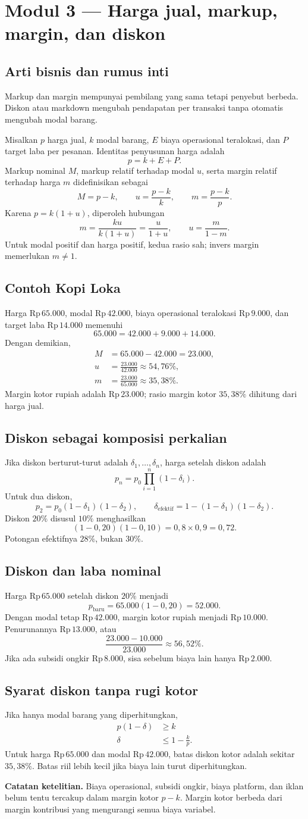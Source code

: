 \documentclass[11pt,a4paper]{article}
\newcommand{\modul}[2]{\clearpage\section{Modul #1 --- #2}}
\newcommand{\bagian}[1]{\Needspace{5\baselineskip}\subsection{#1}}
\newcommand{\catatan}[1]{\par\textbf{Catatan ketelitian.} #1\par}
\newcommand{\rp}[1]{\ensuremath{\mathrm{Rp}\,#1}}
\begin{document}
\modul{3}{Harga jual, markup, margin, dan diskon}
\bagian{Arti bisnis dan rumus inti}
Markup dan margin mempunyai pembilang yang sama tetapi penyebut berbeda. Diskon atau markdown mengubah pendapatan per transaksi tanpa otomatis mengubah modal barang.

Misalkan \(p\) harga jual, \(k\) modal barang, \(E\) biaya operasional teralokasi, dan \(P\) target laba per pesanan. Identitas penyusunan harga adalah
\[
p=k+E+P.
\]
Markup nominal \(M\), markup relatif terhadap modal \(u\), serta margin relatif terhadap harga \(m\) didefinisikan sebagai
\[
M=p-k,\qquad u=\frac{p-k}{k},\qquad m=\frac{p-k}{p}.
\]
Karena \(p=k(1+u)\), diperoleh hubungan
\[
m=\frac{ku}{k(1+u)}=\frac{u}{1+u},\qquad
u=\frac{m}{1-m}.
\]
Untuk modal positif dan harga positif, kedua rasio sah; invers margin memerlukan \(m\ne1\).

\bagian{Contoh Kopi Loka}
Harga \rp{65.000}, modal \rp{42.000}, biaya operasional teralokasi \rp{9.000}, dan target laba \rp{14.000} memenuhi
\[
65.000=42.000+9.000+14.000.
\]
Dengan demikian,
\[
\begin{aligned}
M&=65.000-42.000=23.000,\\
u&=\frac{23.000}{42.000}\approx54{,}76\%,\\
m&=\frac{23.000}{65.000}\approx35{,}38\%.
\end{aligned}
\]
Margin kotor rupiah adalah \rp{23.000}; rasio margin kotor \(35{,}38\%\) dihitung dari harga jual.

\bagian{Diskon sebagai komposisi perkalian}
Jika diskon berturut-turut adalah \(\delta_1,\ldots,\delta_n\), harga setelah diskon adalah
\[
p_n=p_0\prod_{i=1}^{n}(1-\delta_i).
\]
Untuk dua diskon,
\[
p_2=p_0(1-\delta_1)(1-\delta_2),\qquad
\delta_{\text{efektif}}=1-(1-\delta_1)(1-\delta_2).
\]
Diskon \(20\%\) disusul \(10\%\) menghasilkan
\[
(1-0{,}20)(1-0{,}10)=0{,}8\times0{,}9=0{,}72.
\]
Potongan efektifnya \(28\%\), bukan \(30\%\).

\bagian{Diskon dan laba nominal}
Harga \rp{65.000} setelah diskon \(20\%\) menjadi
\[
p_{\text{baru}}=65.000(1-0{,}20)=52.000.
\]
Dengan modal tetap \rp{42.000}, margin kotor rupiah menjadi \rp{10.000}. Penurunannya \rp{13.000}, atau
\[
\frac{23.000-10.000}{23.000}\approx56{,}52\%.
\]
Jika ada subsidi ongkir \rp{8.000}, sisa sebelum biaya lain hanya \rp{2.000}.

\bagian{Syarat diskon tanpa rugi kotor}
Jika hanya modal barang yang diperhitungkan,
\[
\begin{aligned}
p(1-\delta)&\ge k\\
\delta&\le 1-\frac{k}{p}.
\end{aligned}
\]
Untuk harga \rp{65.000} dan modal \rp{42.000}, batas diskon kotor adalah sekitar \(35{,}38\%\). Batas riil lebih kecil jika biaya lain turut diperhitungkan.
\catatan{Biaya operasional, subsidi ongkir, biaya platform, dan iklan belum tentu tercakup dalam margin kotor \(p-k\). Margin kotor berbeda dari margin kontribusi yang mengurangi semua biaya variabel.}
\end{document}
